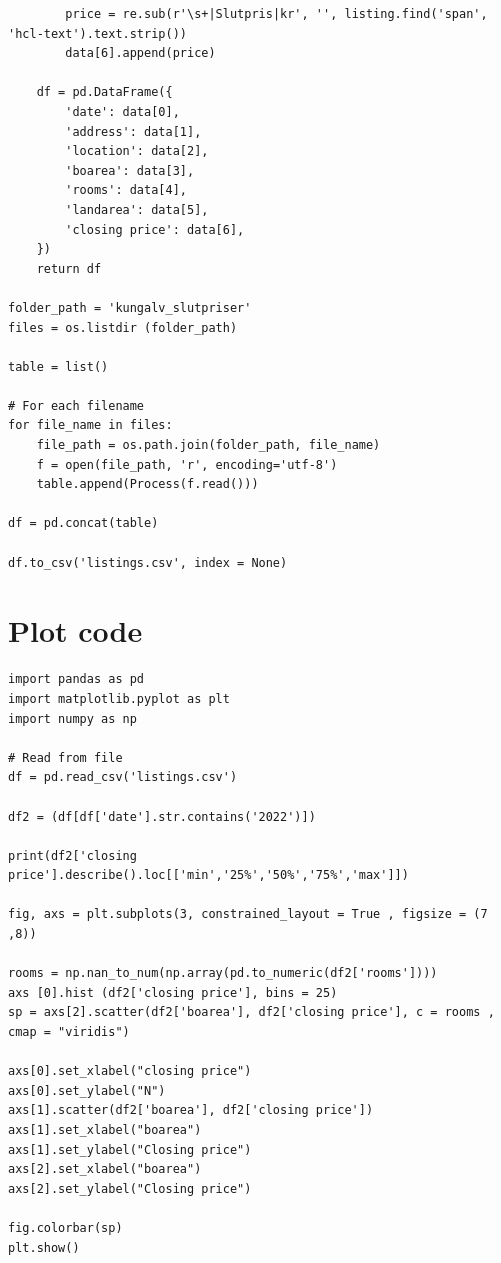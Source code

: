 \documentclass[a4paper]{article}
\begin{document}
\begin{lstlisting}
        price = re.sub(r'\s+|Slutpris|kr', '', listing.find('span', 'hcl-text').text.strip())
        data[6].append(price)

    df = pd.DataFrame({
        'date': data[0],
        'address': data[1],
        'location': data[2],
        'boarea': data[3],
        'rooms': data[4],
        'landarea': data[5],
        'closing price': data[6],
    })
    return df

folder_path = 'kungalv_slutpriser'
files = os.listdir (folder_path)

table = list()

# For each filename
for file_name in files:
    file_path = os.path.join(folder_path, file_name)
    f = open(file_path, 'r', encoding='utf-8')
    table.append(Process(f.read()))

df = pd.concat(table)

df.to_csv('listings.csv', index = None)

\end{lstlisting}

\section*{Plot code}

\begin{lstlisting}
import pandas as pd
import matplotlib.pyplot as plt
import numpy as np

# Read from file
df = pd.read_csv('listings.csv')

df2 = (df[df['date'].str.contains('2022')])

print(df2['closing price'].describe().loc[['min','25%','50%','75%','max']])

fig, axs = plt.subplots(3, constrained_layout = True , figsize = (7 ,8))

rooms = np.nan_to_num(np.array(pd.to_numeric(df2['rooms'])))
axs [0].hist (df2['closing price'], bins = 25)
sp = axs[2].scatter(df2['boarea'], df2['closing price'], c = rooms , cmap = "viridis")

axs[0].set_xlabel("closing price")
axs[0].set_ylabel("N")
axs[1].scatter(df2['boarea'], df2['closing price'])
axs[1].set_xlabel("boarea")
axs[1].set_ylabel("Closing price")
axs[2].set_xlabel("boarea")
axs[2].set_ylabel("Closing price")

fig.colorbar(sp)
plt.show()
\end{lstlisting}
\end{document}
